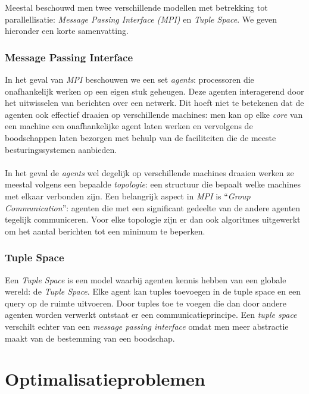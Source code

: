 Meestal beschouwd men twee verschillende modellen met betrekking tot parallellisatie: \emph{Message Passing Interface (MPI)} en \emph{Tuple Space}. We geven hieronder een korte samenvatting.

\subsubsection{Message Passing Interface}

In het geval van \emph{MPI} beschouwen we een set \emph{agents}: processoren die onafhankelijk werken op een eigen stuk geheugen. Deze agenten interagerend door het uitwisselen van berichten over een netwerk. Dit hoeft niet te betekenen dat de agenten ook effectief draaien op verschillende machines: men kan op elke \emph{core} van een machine een onafhankelijke agent laten werken en vervolgens de boodschappen laten bezorgen met behulp van de faciliteiten die de meeste besturingssystemen aanbieden.

\paragraph{}
In het geval de \emph{agents} wel degelijk op verschillende machines draaien werken ze meestal volgens een bepaalde \emph{topologie}: een structuur die bepaalt welke machines met elkaar verbonden zijn. Een belangrijk aspect in \emph{MPI} is ``\emph{Group Communication}'': agenten die met een significant gedeelte van de andere agenten tegelijk communiceren. Voor elke topologie zijn er dan ook algoritmes uitgewerkt om het aantal berichten tot een minimum te beperken.

\subsubsection{Tuple Space}

Een \emph{Tuple Space} is een model waarbij agenten kennis hebben van een globale wereld: de \emph{Tuple Space}. Elke agent kan tuples toevoegen in de tuple space en een query op de ruimte uitvoeren. Door tuples toe te voegen die dan door andere agenten worden verwerkt ontstaat er een communicatieprincipe. Een \emph{tuple space} verschilt echter van een \emph{message passing interface} omdat men meer abstractie maakt van de bestemming van een boodschap.

\section{Optimalisatieproblemen}

